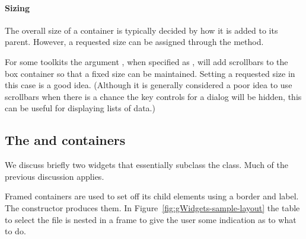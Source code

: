 



\paragraph{Sizing}
The overall size of a  container is typically decided by
how it is added to its parent. However, a requested size can be assigned
through the  method. 


For some toolkits the argument ,
when specified as , will add scrollbars to the box
container so that a fixed size can be maintained. Setting a requested
size in this case is a good idea. (Although it is generally
considered a poor idea to use scrollbars when there is a chance the
key controls for a dialog will be hidden, this can be useful for
displaying lists of data.)






\subsection{The  and  containers}
\label{sec:gWidgets-decorated-cont}

We discuss briefly two widgets that essentially subclass the
 class. Much of the previous discussion applies.

Framed containers are used to set off its child elements using a
border and label. The  constructor produces
them. In Figure~\ref{fig:gWidgets-sample-layout} the table to select
the file is nested in a frame to give the user some indication
as to what to do.

